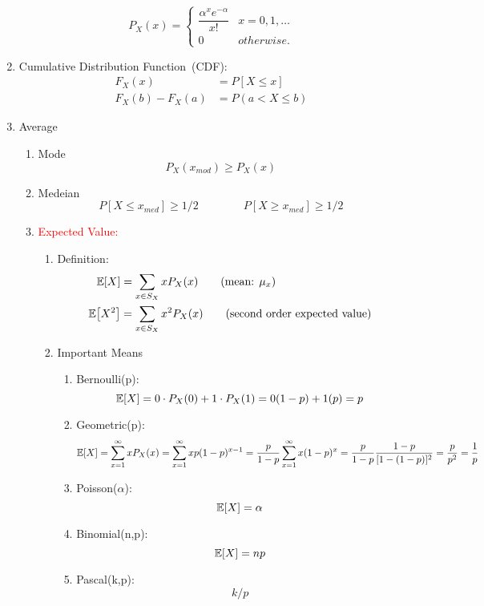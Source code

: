 \begin{enumerate}
{\begin{enumerate}
{                \[ P_X(x) = 
                \begin{cases}
                    \dfrac{\alpha^xe^{-\alpha}}{x!}   & x=0,1,\ldots \\
                    0   & otherwise.
                \end{cases} \]
            }
        \end{enumerate}
    }
    \item Cumulative Distribution Function~(CDF): {
        \begin{align*}
            F_X(x)&=P[X\leq x] \\
            F_X(b)-F_X(a)&=P(a<X\leq b)
        \end{align*}
    }
    \item Average{
        \begin{enumerate}
            \item Mode $$P_X(x_{mod})\geq P_X(x)$$
            \item Medeian $$P[X\leq x_{med}]\geq 1/2 \qquad \qquad P[X\geq x_{med}]\geq 1/2$$
            \item \textcolor{red}{Expected Value:} {
                \begin{enumerate}
                    \item Definition:{
                        \begin{align}
                            \E{X}&=\sum_{x\in S_X}xP_X(x) \tag{mean: $\mu_x$}\\
                            \E{X^2}&=\sum_{x\in S_X}x^2P_X(x) \tag{second order expected value}
                        \end{align}
                    }
                    \item Important Means{
                        \begin{enumerate}
                            \item Bernoulli(p): $$\E{X}=0\cdot P_X(0)+1\cdot P_X(1)=0(1-p)+1(p)=p$$
                            \item Geometric(p): $$\E{X}=\sum_{x=1}^{\infty}xP_X(x)=\sum_{x=1}^{\infty}xp(1-p)^{x-1}=\dfrac{p}{1-p}\sum_{x=1}^{\infty}x(1-p)^x=\dfrac{p}{1-p}\dfrac{1-p}{[1-(1-p)]^2}=\dfrac{p}{p^2}=\dfrac{1}{p}$$
                            \item Poisson($\alpha$): $$\E{X}=\alpha$$
                            \item Binomial(n,p): $$\E{X}=np$$
                            \item Pascal(k,p): $$k/p$$

\end{enumerate}}
\end{enumerate}}
\end{enumerate}}
\end{enumerate}
